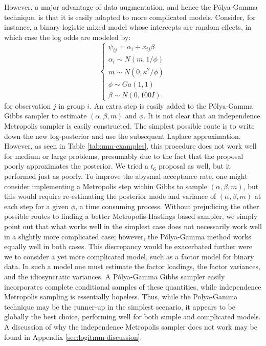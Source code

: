 \documentclass[11pt]{article}
\newcommand{\Polya}{P\'{o}lya}
\begin{document}
However, a major advantage of data augmentation, and hence the \Polya-Gamma
technique, is that it is easily adapted to more complicated models.  Consider,
for instance, a binary logistic mixed model whose intercepts are random effects,
in which case the log odds are modeled by:
\begin{equation}
\label{eqn:mixed-model}
\begin{cases}
\psi_{ij} = \alpha_i + x_{ij} \beta \\
\alpha_i \sim N(m, 1/\phi) \\
m \sim N(0, \kappa^2 / \phi) \\
\phi \sim Ga(1,1) \\
\beta \sim N(0, 100 I).
\end{cases}
\end{equation}
for observation $j$ in group $i$.  An extra step is easily added to the
\Polya-Gamma Gibbs sampler to estimate $(\alpha, \beta, m)$ and $\phi$.  It is
not clear that an independence Metropolis sampler is easily constructed.  The
simplest possible route is to write down the new log-posterior and use the
subsequent Laplace approximation.  However, as seen in Table
\ref{tab:mm-examples}, this procedure does not work well for medium or large
problems, presumably due to the fact that the proposal poorly approximates the
posterior.  We tried a $t_6$ proposal as well, but it performed just as poorly.
To improve the abysmal acceptance rate, one might consider implementing a
Metropolis step within Gibbs to sample $(\alpha,\beta,m)$, but this would
require re-estimating the posterior mode and variance of $(\alpha,\beta,m)$ at
each step for a given $\phi$, a time consuming process.  Without prejudicing the
other possible routes to finding a better Metropolis-Hastings based sampler, we
simply point out that what works well in the simplest case does not necessarily
work well in a slightly more complicated case; however, the \Polya-Gamma method
works equally well in both cases.  This discrepancy would be exacerbated further
were we to consider a yet more complicated model, such as a factor model for
binary data.  In such a model one must estimate the factor loadings, the factor
variances, and the idiosyncratic variances.  A \Polya-Gamma Gibbs sampler easily
incorporates complete conditional samples of these quantities, while
independence Metropolis sampling is essentially hopeless.  Thus, while the
Polya-Gamma technique may be the runner-up in the simplest scenario, it appears
to be globally the best choice, performing well for both simple and complicated
models.  A discussion of why the independence Metropolis sampler does not work
may be found in Appendix \ref{sec:logitmm-discussion}.
\end{document}
